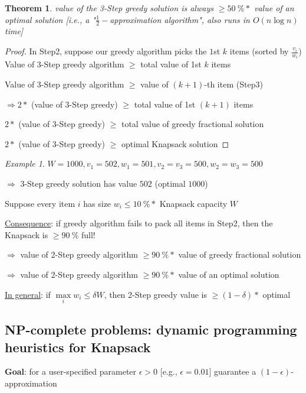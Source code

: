 \documentclass[a4paper,12pt]{article}
\theoremstyle{plain}
\newtheorem*{theorem}{Theorem}
\theoremstyle{definition}
\theoremstyle{remark}
\newtheorem*{example}{Example}
\begin{document}
\begin{theorem}
value of the 3-Step greedy solution is always $\geq 50~\%*$ value of an optimal solution [i.e., a "$\frac{1}{2}-$approximation algorithm", also runs in $O(n \log n)$ time]
\end{theorem}

\begin{proof}
In Step2, suppose our greedy algorithm picks the $1$st $k$ items (sorted by $\frac{v_i}{w_i}$)
\\

Value of 3-Step greedy algorithm $\geq$ total value of 1st $k$ items

Value of 3-Step greedy algorithm $\geq$ value of $(k+1)$-th item (Step3)

$\Rightarrow 2 * $ (value of 3-Step greedy) $\geq$ total value of 1st $(k+1)$ items

$2 * $ (value of 3-Step greedy) $\geq$ total value of greedy fractional solution

$2 * $ (value of 3-Step greedy) $\geq$ optimal Knapsack solution
\end{proof}

\begin{example}$W = 1000, v_1 = 502, w_1 = 501, v_2 = v_3 = 500, w_2 = w_3 = 500$

$\Rightarrow$ 3-Step greedy solution has value $502$ (optimal $1000$)
\end{example}

Suppose every item $i$ has size $w_i \leq 10~\% *$ Knapsack capacity $W$

\underline{Consequence}: if greedy algorithm fails to pack all items in Step2, then the Knapsack is $\geq 90~\%$ full!

$\Rightarrow$ value of 2-Step greedy algorithm $\geq 90~\% *$ value of greedy fractional solution

$\Rightarrow$ value of 2-Step greedy algorithm $\geq 90~\% *$ value of an optimal solution

\underline{In general}: if $\max\limits_{i} w_i \leq \delta W$, then 2-Step greedy value is $\geq (1-\delta)*$ optimal



\subsection{NP-complete problems: dynamic programming heuristics for Knapsack}
\textbf{Goal}: for a user-specified parameter $\epsilon > 0$ [e.g., $\epsilon = 0.01$] guarantee a $(1-\epsilon)$-approximation
\end{document}
